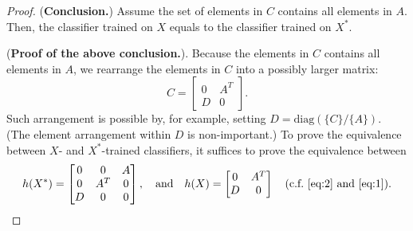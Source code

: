 \documentclass[11pt]{article}
\theoremstyle{plain}
\theoremstyle{definition}
\begin{document}
\begin{proof}
({\bf Conclusion.}) Assume the set of elements in $C$ contains all elements in $A$. Then, the classifier trained on $X$ equals to the classifier trained on $X^*$.

({\bf Proof of the above conclusion.}). Because the elements in $C$ contains all elements in $A$, we rearrange the elements in $C$ into a possibly larger matrix:
\begin{equation}\label{eq:1}
C=\begin{bmatrix}
0&A^T\\
D&0
\end{bmatrix}.
\end{equation}
Such arrangement is possible by, for example, setting $D=\text{diag}(\{C\}/\{A\})$. (The element arrangement within $D$ is non-important.) To prove the equivalence between $X$- and $X^*$-trained classifiers, it suffices to prove the equivalence between
\[
h(X^*)=\begin{bmatrix}
0&0&A\\
0&A^T&0\\
D&0&0\\
\end{bmatrix},\quad \text{and}\quad 
h(X)=\begin{bmatrix}
0 & A^T\\
D&0
\end{bmatrix}\quad 
\text{(c.f.~\eqref{eq:2} and~\eqref{eq:1})}.
\]


\end{proof}
\end{document}

